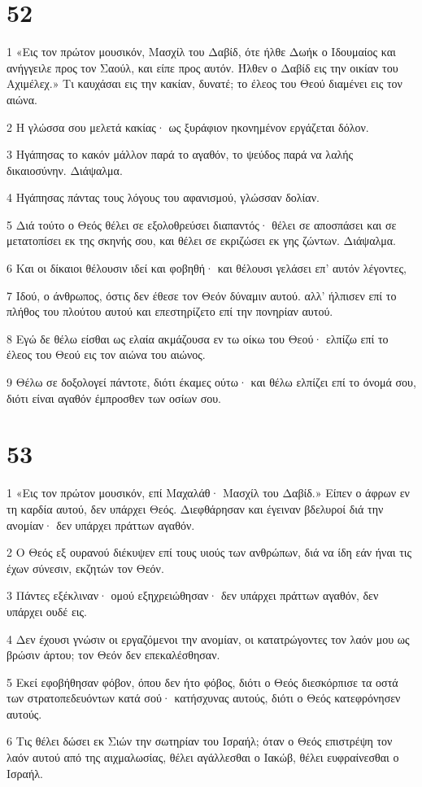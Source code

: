 \chapter{52}

\par 1 «Εις τον πρώτον μουσικόν, Μασχίλ του Δαβίδ, ότε ήλθε Δωήκ ο Ιδουμαίος και ανήγγειλε προς τον Σαούλ, και είπε προς αυτόν. Ήλθεν ο Δαβίδ εις την οικίαν του Αχιμέλεχ.» Τι καυχάσαι εις την κακίαν, δυνατέ; το έλεος του Θεού διαμένει εις τον αιώνα.
\par 2 Η γλώσσα σου μελετά κακίας· ως ξυράφιον ηκονημένον εργάζεται δόλον.
\par 3 Ηγάπησας το κακόν μάλλον παρά το αγαθόν, το ψεύδος παρά να λαλής δικαιοσύνην. Διάψαλμα.
\par 4 Ηγάπησας πάντας τους λόγους του αφανισμού, γλώσσαν δολίαν.
\par 5 Διά τούτο ο Θεός θέλει σε εξολοθρεύσει διαπαντός· θέλει σε αποσπάσει και σε μετατοπίσει εκ της σκηνής σου, και θέλει σε εκριζώσει εκ γης ζώντων. Διάψαλμα.
\par 6 Και οι δίκαιοι θέλουσιν ιδεί και φοβηθή· και θέλουσι γελάσει επ' αυτόν λέγοντες,
\par 7 Ιδού, ο άνθρωπος, όστις δεν έθεσε τον Θεόν δύναμιν αυτού. αλλ' ήλπισεν επί το πλήθος του πλούτου αυτού και επεστηρίζετο επί την πονηρίαν αυτού.
\par 8 Εγώ δε θέλω είσθαι ως ελαία ακμάζουσα εν τω οίκω του Θεού· ελπίζω επί το έλεος του Θεού εις τον αιώνα του αιώνος.
\par 9 Θέλω σε δοξολογεί πάντοτε, διότι έκαμες ούτω· και θέλω ελπίζει επί το όνομά σου, διότι είναι αγαθόν έμπροσθεν των οσίων σου.

\chapter{53}

\par 1 «Εις τον πρώτον μουσικόν, επί Μαχαλάθ· Μασχίλ του Δαβίδ.» Είπεν ο άφρων εν τη καρδία αυτού, δεν υπάρχει Θεός. Διεφθάρησαν και έγειναν βδελυροί διά την ανομίαν· δεν υπάρχει πράττων αγαθόν.
\par 2 Ο Θεός εξ ουρανού διέκυψεν επί τους υιούς των ανθρώπων, διά να ίδη εάν ήναι τις έχων σύνεσιν, εκζητών τον Θεόν.
\par 3 Πάντες εξέκλιναν· ομού εξηχρειώθησαν· δεν υπάρχει πράττων αγαθόν, δεν υπάρχει ουδέ εις.
\par 4 Δεν έχουσι γνώσιν οι εργαζόμενοι την ανομίαν, οι κατατρώγοντες τον λαόν μου ως βρώσιν άρτου; τον Θεόν δεν επεκαλέσθησαν.
\par 5 Εκεί εφοβήθησαν φόβον, όπου δεν ήτο φόβος, διότι ο Θεός διεσκόρπισε τα οστά των στρατοπεδευόντων κατά σού· κατήσχυνας αυτούς, διότι ο Θεός κατεφρόνησεν αυτούς.
\par 6 Τις θέλει δώσει εκ Σιών την σωτηρίαν του Ισραήλ; όταν ο Θεός επιστρέψη τον λαόν αυτού από της αιχμαλωσίας, θέλει αγάλλεσθαι ο Ιακώβ, θέλει ευφραίνεσθαι ο Ισραήλ.

